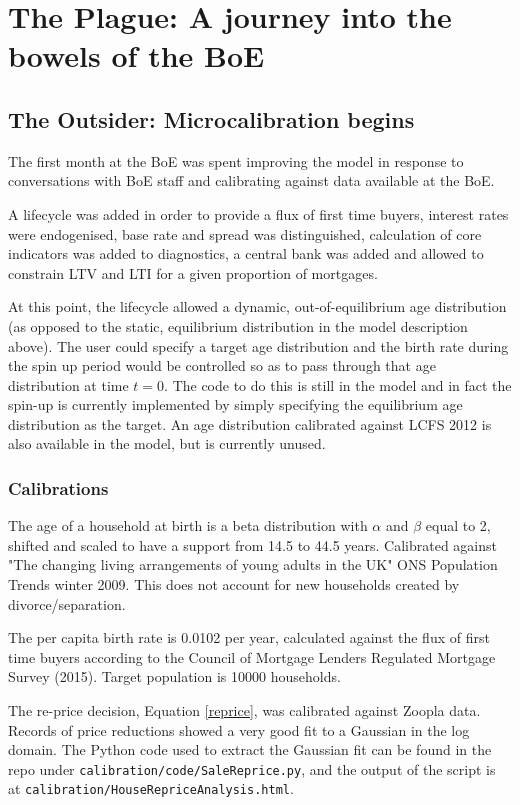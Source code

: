\documentclass{report}
\begin{document}
\section{The Plague: A journey into the bowels of the BoE}

\subsection{The Outsider: Microcalibration begins}
The first month at the BoE was spent improving the model in response to conversations with BoE staff and calibrating against data available at the BoE.

A lifecycle was added in order to provide a flux of first time buyers, interest rates were endogenised, base rate and spread was distinguished, calculation of core indicators was added to diagnostics, a central bank was added and allowed to constrain LTV and LTI for a given proportion of mortgages.

At this point, the lifecycle allowed a dynamic, out-of-equilibrium age distribution (as opposed to the static, equilibrium distribution in the model description above). The user could specify a target age distribution and the birth rate during the spin up period would be controlled so as to pass through that age distribution at time $t=0$. The code to do this is still in the model and in fact the spin-up is currently implemented by simply specifying the equilibrium age distribution as the target. An age distribution calibrated against LCFS 2012 is also available in the model, but is currently unused.

\subsubsection{Calibrations}

The age of a household at birth is a beta distribution with $\alpha$ and $\beta$ equal to 2, shifted and scaled to have a support from 14.5 to 44.5 years. Calibrated against "The changing living arrangements of young adults in the UK" ONS Population Trends winter 2009. This does not account for new households created by divorce/separation.

The per capita birth rate is 0.0102 per year, calculated against the flux of first time buyers according to the Council of Mortgage Lenders Regulated Mortgage Survey (2015). Target population is 10000 households.

The re-price decision, Equation \ref{reprice}, was calibrated against Zoopla data. Records of price reductions showed a very good fit to a Gaussian in the log domain. The Python code used to extract the Gaussian fit can be found in the repo under \texttt{calibration/code/SaleReprice.py}, and the output of the script is at \texttt{calibration/HouseRepriceAnalysis.html}.
\end{document}
